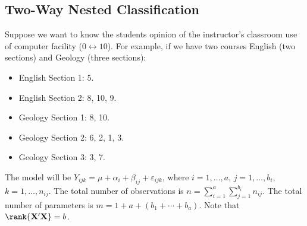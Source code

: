 \subsection*{Two-Way Nested Classification}
Suppose we want to know the students opinion of the instructor's
classroom use of computer facility ($ 0\leftrightarrow 10 $).
For example, if we have two courses English (two sections) and Geology (three sections):
\begin{itemize}
    \item English Section 1: 5.
    \item English Section 2: 8, 10, 9.
    \item Geology Section 1: 8, 10.
    \item Geology Section 2: 6, 2, 1, 3.
    \item Geology Section 3: 3, 7.
\end{itemize}
The model will be $ Y_{ijk}=\mu+\alpha_i+\beta_{ij}+\varepsilon_{ijk} $,
where $ i=1,\ldots,a $, $ j=1,\ldots,b_i $, $ k=1,\ldots,n_{ij} $.
The total number of observations is $ n=\sum_{i=1}^{a}\sum_{j=1}^{b_i}n_{ij} $.
The total number of parameters is $ m=1+a+(b_1+\cdots+b_a) $.
Note that $ \rank{\Matrix{X}'\Matrix{X}}=b $.
